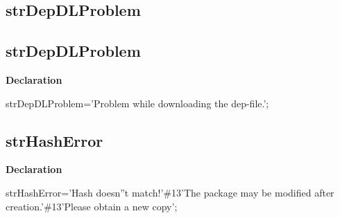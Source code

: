 \documentclass{report}
\newif\ifpdf
\begin{document}
\subsection*{\large{\textbf{strDepDLProblem}}\normalsize\hspace{1ex}\hrulefill}
\else
\subsection*{strDepDLProblem}
\fi
\label{trstrings-strDepDLProblem}
\begin{list}{}{
\setlength{\itemindent}{0cm}
\setlength{\listparindent}{0cm}
\setlength{\leftmargin}{\evensidemargin}
\addtolength{\leftmargin}{\tmplength}
\settowidth{\labelsep}{X}
\addtolength{\leftmargin}{\labelsep}
\setlength{\labelwidth}{\tmplength}
}
\item[\textbf{Declaration}\hfill]
\ifpdf
\begin{flushleft}
\fi
\begin{ttfamily}
strDepDLProblem='Problem while downloading the dep-file.';\end{ttfamily}

\ifpdf
\end{flushleft}
\fi

\end{list}
\ifpdf
\subsection*{\large{\textbf{strHashError}}\normalsize\hspace{1ex}\hrulefill}
\else
\subsection*{strHashError}
\fi
\label{trstrings-strHashError}
\begin{list}{}{
\setlength{\itemindent}{0cm}
\setlength{\listparindent}{0cm}
\setlength{\leftmargin}{\evensidemargin}
\addtolength{\leftmargin}{\tmplength}
\settowidth{\labelsep}{X}
\addtolength{\leftmargin}{\labelsep}
\setlength{\labelwidth}{\tmplength}
}
\item[\textbf{Declaration}\hfill]
\ifpdf
\begin{flushleft}
\fi
\begin{ttfamily}
strHashError='Hash doesn''t match!'{\#}13'The package may be modified after creation.'{\#}13'Please obtain a new copy';\end{ttfamily}

\ifpdf
\end{flushleft}
\fi

\end{list}
\ifpdf
\end{document}
